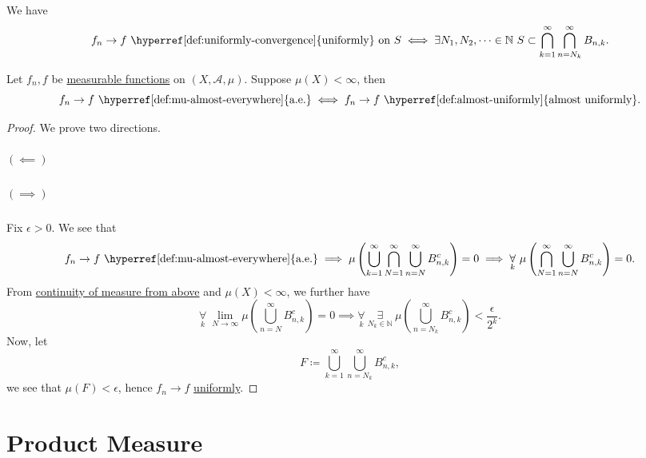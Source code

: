 \begin{lemma}
	We have
	\[
		f_{n}\to f \text{ \hyperref[def:uniformly-convergence]{uniformly} on } S \iff \exists N_1, N_2, \dots\in \mathbb{N}\ S\subset \bigcap_{k=1}^{\infty} \bigcap_{n=N_k}^{\infty} B_{n, k}.
	\]
\end{lemma}

\begin{theorem}\label{thm:Egorov}
	Let \(f_{n}, f\) be \hyperref[def:measurable-function]{measurable functions} on \((X, \mathcal{A} , \mu )\). Suppose \(\mu (X)<\infty \), then
	\[
		f_{n}\to f\text{ \hyperref[def:mu-almost-everywhere]{a.e.}} \iff f_{n}\to f\text{ \hyperref[def:almost-uniformly]{almost uniformly}}.
	\]
\end{theorem}
\begin{proof}
	We prove two directions.
	\paragraph{\((\impliedby)\)}

	\paragraph{\((\implies )\)}
	Fix \(\epsilon > 0\). We see that
	\[
		\begin{split}
			f_{n}\to f\text{ \hyperref[def:mu-almost-everywhere]{a.e.}}
			\implies \mu \left(\bigcup_{k=1}^{\infty} \bigcap_{N=1}^{\infty} \bigcup_{n=N}^{\infty} B_{n, k}^{c} \right) = 0
			\implies \underset{k}{\forall}\ \mu \left(\bigcap_{N=1}^{\infty} \bigcup_{n=N}^{\infty} B_{n, k}^{c} \right) = 0.
		\end{split}
	\]
	From \hyperref[thm:measure-space-continuity-from-above]{continuity of measure from above} and \(\mu (X)<\infty \), we further have
	\[
		\underset{k}{\forall}\ \lim_{N \to \infty} \mu \left(\bigcup_{n=N}^{\infty} B_{n, k}^{c} \right) = 0 \implies \underset{k}{\forall}\ \underset{ N_{k}\in\mathbb{N}}{\exists}\ \mu \left(\bigcup_{n=N_{k}}^{\infty} B_{n, k}^{c} \right)< \frac{\epsilon}{2^k}.
	\]
	Now, let
	\[
		F \coloneqq \bigcup_{k=1}^{\infty} \bigcup_{n=N_{k}}^{\infty} B_{n, k}^{c} ,
	\]
	we see that \(\mu (F) < \epsilon \), hence \(f_{n}\to f\) \hyperref[def:uniformly-convergence]{uniformly}.
\end{proof}

\chapter{Product Measure}\label{ch:Product-Measure}
